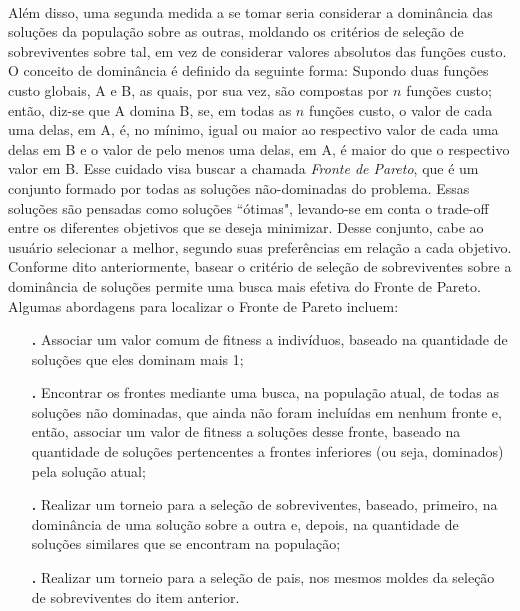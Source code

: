 \documentclass{report}
\begin{document}
\paragraph{} Além disso, uma segunda medida a se tomar seria considerar a dominância das soluções da população sobre as outras, moldando os critérios de seleção de sobreviventes sobre tal, em vez de considerar valores absolutos das funções custo. O conceito de dominância é definido da seguinte forma: Supondo duas funções custo globais, A e B, as quais, por sua vez, são compostas por $n$ funções custo; então, diz-se que A domina B, se, em todas as $n$ funções custo, o valor de cada uma delas, em A, é, no mínimo, igual ou maior ao respectivo valor de cada uma delas em B e o valor de pelo menos uma delas, em A, é maior do que o respectivo valor em B. Esse cuidado visa buscar a chamada \textit{Fronte de Pareto}, que é um conjunto formado por todas as soluções não-dominadas do problema. Essas soluções são pensadas como soluções ``ótimas", levando-se em conta o trade-off entre os diferentes objetivos que se deseja minimizar. Desse conjunto, cabe ao usuário selecionar a melhor, segundo suas preferências em relação a cada objetivo. Conforme dito anteriormente, basear o critério de seleção de sobreviventes sobre a dominância de soluções permite uma busca mais efetiva do Fronte de Pareto. Algumas abordagens para localizar o Fronte de Pareto incluem:\\

\begin{itemize}

	\item[\textbf{.}] Associar um valor comum de fitness a indivíduos, baseado na quantidade de soluções que eles dominam mais 1;\\
	
	\item[\textbf{.}] Encontrar os frontes mediante uma busca, na população atual, de todas as soluções não dominadas, que ainda não foram incluídas em nenhum fronte e, então, associar um valor de fitness a soluções desse fronte, baseado na quantidade de soluções pertencentes a frontes inferiores (ou seja, dominados) pela solução atual;\\
	
	\item[\textbf{.}] Realizar um torneio para a seleção de sobreviventes, baseado, primeiro, na dominância de uma solução sobre a outra e, depois, na quantidade de soluções similares que se encontram na população;\\
	
	\item[\textbf{.}] Realizar um torneio para a seleção de pais, nos mesmos moldes da seleção de sobreviventes do item anterior.\\
	
\end{itemize}
\end{document}
